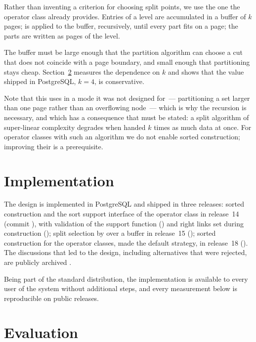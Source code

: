 Rather than inventing a criterion for choosing split points, we use the one the
operator class already provides. Entries of a level are accumulated in a buffer
of $k$ pages;  is applied to the buffer, recursively, until every
part fits on a page; the parts are written as pages of the level.

The buffer must be large enough that the partition algorithm can choose a cut
that does not coincide with a page boundary, and small enough that partitioning
stays cheap. Section~\ref{sec:eval} measures the dependence on $k$ and shows
that the value shipped in PostgreSQL, $k=4$, is conservative.

Note that this uses  in a mode it was not designed for~---
partitioning a set larger than one page rather than an overflowing node~---
which is why the recursion is necessary, and which has a consequence that must
be stated: a split algorithm of super-linear complexity degrades when handed $k$
times as much data at once. For operator classes with such an algorithm we do
not enable sorted construction; improving their  is a
prerequisite.

\section{Implementation}
\label{sec:impl}

The design is implemented in PostgreSQL and shipped in three releases: sorted
construction and the sort support interface of the operator class in release~14
(commit ), with validation of the support function
() and right links set during construction
(); split selection by  over a buffer in
release~15 (); sorted construction for the
 operator classes, made the default strategy, in release~18
(). The discussions that led to the design, including
alternatives that were rejected, are publicly archived
\cite{thread-fast-build,thread-btree-gist-sort}.

Being part of the standard distribution, the implementation is available to
every user of the system without additional steps, and every measurement below
is reproducible on public releases.

\section{Evaluation}
\label{sec:eval}

